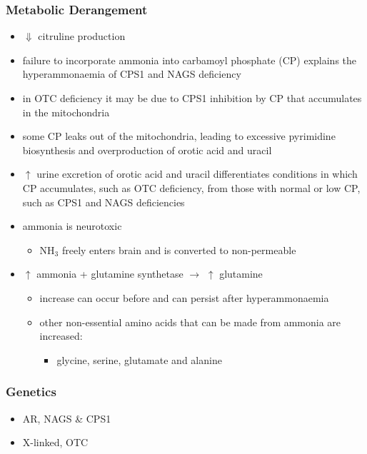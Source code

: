 \documentclass{scrartcl}
\begin{document}
\subsubsection{Metabolic Derangement}
\label{sec:orgd5d3159}
\begin{itemize}
\item \(\Downarrow\) citruline production
\item failure to incorporate ammonia into carbamoyl phosphate (CP)
explains the hyperammonaemia of CPS1 and NAGS deficiency
\item in OTC deficiency it may be due to CPS1 inhibition by CP
that accumulates in the mitochondria
\item some CP leaks out of the mitochondria, leading to excessive
pyrimidine biosynthesis and overproduction of orotic acid and
uracil
\item \(\uparrow\) urine excretion of orotic acid and uracil differentiates
conditions in which CP accumulates, such as OTC deficiency, from
those with normal or low CP, such as CPS1 and NAGS deficiencies
\item ammonia is neurotoxic
\begin{itemize}
\item NH\(_{\text{3}}\) freely enters brain and is converted to non-permeable
\end{itemize}
\item \(\uparrow\) ammonia + glutamine synthetase \(\to\) \(\uparrow\) glutamine
\begin{itemize}
\item increase can occur before and can persist after hyperammonaemia
\item other non-essential amino acids that can be made from ammonia are increased:
\begin{itemize}
\item glycine, serine, glutamate and alanine
\end{itemize}
\end{itemize}
\end{itemize}

\subsubsection{Genetics}
\label{sec:org6150ce5}
\begin{itemize}
\item AR, NAGS \& CPS1
\item X-linked, OTC
\end{itemize}
\end{document}
